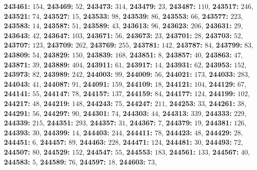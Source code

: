 \textsf{\bfseries 243461:} $154$, \textsf{\bfseries 243469:} $52$, \textsf{\bfseries 243473:} $314$, \textsf{\bfseries 243479:} $23$, \textsf{\bfseries 243487:} $110$, \textsf{\bfseries 243517:} $246$, \textsf{\bfseries 243521:} $74$, \textsf{\bfseries 243527:} $15$, \textsf{\bfseries 243533:} $98$, \textsf{\bfseries 243539:} $86$, \textsf{\bfseries 243553:} $66$, \textsf{\bfseries 243577:} $223$, \textsf{\bfseries 243583:} $14$, \textsf{\bfseries 243587:} $51$, \textsf{\bfseries 243589:} $43$, \textsf{\bfseries 243613:} $96$, \textsf{\bfseries 243623:} $206$, \textsf{\bfseries 243631:} $29$, \textsf{\bfseries 243643:} $42$, \textsf{\bfseries 243647:} $103$, \textsf{\bfseries 243671:} $56$, \textsf{\bfseries 243673:} $23$, \textsf{\bfseries 243701:} $28$, \textsf{\bfseries 243703:} $52$, \textsf{\bfseries 243707:} $123$, \textsf{\bfseries 243709:} $262$, \textsf{\bfseries 243769:} $255$, \textsf{\bfseries 243781:} $142$, \textsf{\bfseries 243787:} $84$, \textsf{\bfseries 243799:} $83$, \textsf{\bfseries 243809:} $54$, \textsf{\bfseries 243829:} $150$, \textsf{\bfseries 243839:} $168$, \textsf{\bfseries 243851:} $8$, \textsf{\bfseries 243857:} $40$, \textsf{\bfseries 243863:} $47$, \textsf{\bfseries 243871:} $39$, \textsf{\bfseries 243889:} $404$, \textsf{\bfseries 243911:} $61$, \textsf{\bfseries 243917:} $14$, \textsf{\bfseries 243931:} $62$, \textsf{\bfseries 243953:} $152$, \textsf{\bfseries 243973:} $82$, \textsf{\bfseries 243989:} $242$, \textsf{\bfseries 244003:} $99$, \textsf{\bfseries 244009:} $56$, \textsf{\bfseries 244021:} $173$, \textsf{\bfseries 244033:} $283$, \textsf{\bfseries 244043:} $41$, \textsf{\bfseries 244087:} $91$, \textsf{\bfseries 244091:} $159$, \textsf{\bfseries 244109:} $18$, \textsf{\bfseries 244121:} $104$, \textsf{\bfseries 244129:} $67$, \textsf{\bfseries 244141:} $55$, \textsf{\bfseries 244147:} $78$, \textsf{\bfseries 244157:} $137$, \textsf{\bfseries 244159:} $84$, \textsf{\bfseries 244177:} $124$, \textsf{\bfseries 244199:} $102$, \textsf{\bfseries 244217:} $48$, \textsf{\bfseries 244219:} $148$, \textsf{\bfseries 244243:} $75$, \textsf{\bfseries 244247:} $211$, \textsf{\bfseries 244253:} $33$, \textsf{\bfseries 244261:} $38$, \textsf{\bfseries 244291:} $56$, \textsf{\bfseries 244297:} $90$, \textsf{\bfseries 244301:} $74$, \textsf{\bfseries 244303:} $44$, \textsf{\bfseries 244313:} $339$, \textsf{\bfseries 244333:} $229$, \textsf{\bfseries 244339:} $215$, \textsf{\bfseries 244351:} $293$, \textsf{\bfseries 244357:} $31$, \textsf{\bfseries 244367:} $7$, \textsf{\bfseries 244379:} $19$, \textsf{\bfseries 244381:} $126$, \textsf{\bfseries 244393:} $30$, \textsf{\bfseries 244399:} $14$, \textsf{\bfseries 244403:} $244$, \textsf{\bfseries 244411:} $78$, \textsf{\bfseries 244423:} $48$, \textsf{\bfseries 244429:} $28$, \textsf{\bfseries 244451:} $6$, \textsf{\bfseries 244457:} $89$, \textsf{\bfseries 244463:} $228$, \textsf{\bfseries 244471:} $124$, \textsf{\bfseries 244481:} $30$, \textsf{\bfseries 244493:} $72$, \textsf{\bfseries 244507:} $80$, \textsf{\bfseries 244529:} $152$, \textsf{\bfseries 244547:} $55$, \textsf{\bfseries 244553:} $183$, \textsf{\bfseries 244561:} $133$, \textsf{\bfseries 244567:} $40$, \textsf{\bfseries 244583:} $5$, \textsf{\bfseries 244589:} $76$, \textsf{\bfseries 244597:} $18$, \textsf{\bfseries 244603:} $73$, 
